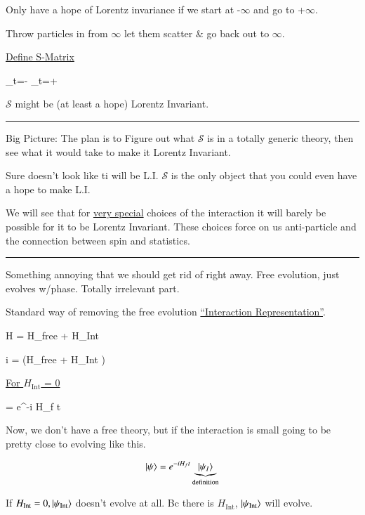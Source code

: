 {Only have a hope of Lorentz invariance if we start at -$\infty$ and go to +$\infty$.

Throw particles in from $\infty$ let them scatter \& go back out to $\infty$.

\underline{Define S-Matrix}

\be
{}_{t=-\infty} \rightarrow {}_{t=+\infty}
\ee

$\mathcal{S}$ might be (at least a hope) Lorentz Invariant.


\noindent\rule{\textwidth}{1pt}

Big Picture:
The plan is to Figure out what $\mathcal{S}$ is in a totally generic theory, then see what it would take to make it Lorentz Invariant. 

Sure doesn't look like ti will be L.I. 
$\mathcal{S}$ is the only object that you could even have a hope to make L.I.

We will see that for \underline{very special} choices of the interaction it will barely be possible for it to be Lorentz Invariant. 
These choices force on us anti-particle and the connection between spin and statistics. 

\noindent\rule{\textwidth}{1pt}

Something annoying that we should get rid of right away. 
Free evolution, just evolves w/phase. Totally irrelevant part.


Standard way of removing the free evolution \underline{``Interaction Representation''}.

\be
H = H_\textrm{free} + H_\textrm{Int}
\ee


\be
i  = \left(H_\textrm{free} + H_\textrm{Int} \right) \ket{\psi} 
\ee

\underline{For $H_\textrm{Int}$ = 0}

\be
\ket{\psi} = e^{-i H_f t} 
\ee

Now, we don't have a free theory, but if the interaction is small going to be pretty close to evolving like this. 


\begin{equation}\label{eq:def}
\ket{\psi} = e^{-i H_f t} \underbrace{\ket{\psi_{I}}}_{\textrm{definition}}
\end{equation}

If $H_\textrm{Int} = 0, \ket{\psi_\textrm{Int}}$ doesn't evolve at all.
Bc there is $H_\textrm{Int}$, $\ket{\psi_\textrm{Int}}$ will evolve. 

}

